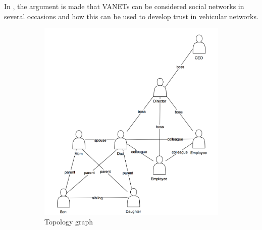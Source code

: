 In , the argument is made that VANETs can be considered social networks in several occasions and how this can be used to develop trust in vehicular networks. 


\begin{figure}
\begin{subfigure}{0.5\textwidth}
\includegraphics[width=\linewidth]{images/socialnetwork_topology.png}
\caption{Topology graph} \label{fig:2_1a}
\end{subfigure}
\hspace*{\fill} %
\begin{subfigure}{0.5\textwidth}

\end{subfigure}
\end{figure}
